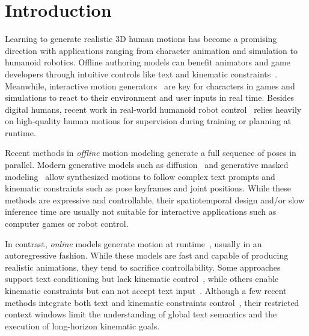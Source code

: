 \section{Introduction}
\label{sec:intro}

Learning to generate realistic 3D human motions has become a promising direction with applications ranging from character animation and simulation to humanoid robotics. 
Offline authoring models can benefit animators and game developers through intuitive controls like text and kinematic constraints~\cite{xie2024omnicontrol,pinyoanuntapong2025MaskControl}.
Meanwhile, interactive motion generators~\cite{shi2024amdm,xiao2025motionstreamer} are key for characters in games and simulations to react to their environment and user inputs in real time. 
Besides digital humans, recent work in real-world humanoid robot control~\cite{liao2025beyondmimic,he2025asap,zhao2025resmimic, luo2025sonic} relies heavily on high-quality human motions for supervision during training or planning at runtime. 


Recent methods in \emph{offline} motion modeling generate a full sequence of poses in parallel. Modern generative models such as diffusion~\cite{tevet2023mdm,zhang2024motiondiffuse, karunratanakul2023gmd, Kimodo2026} and generative masked modeling~\cite{jiang2024motiongpt,guo2024momask, pinyoanuntapong2025MaskControl} allow synthesized motions to follow complex text prompts and kinematic constraints such as pose keyframes and joint positions. 
While these methods are expressive and controllable, their spatiotemporal design and/or slow inference time are usually not suitable for interactive applications such as computer games or robot control.


In contrast, \emph{online} models generate motion at runtime~\cite{holden2017phase,ling2020character,chen2024camdm}, usually in an autoregressive fashion. 
While these models are fast and capable of producing realistic animations, they tend to sacrifice controllability. Some approaches support text conditioning but lack kinematic control~\cite{xiao2025motionstreamer}, while others enable kinematic constraints but can not accept text input~\cite{shi2024amdm,chen2024camdm}.
Although a few recent methods integrate both text and kinematic constraints control~\cite{zhao2025DartControl,tevet2025closd}, their restricted context windows limit the understanding of global text semantics and the execution of long-horizon kinematic goals. 


